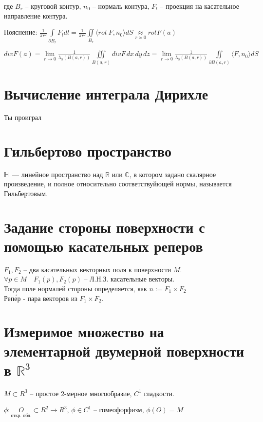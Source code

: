 \documentclass[paper=a4, fontsize=14pt]{article}
\begin{document}
где $ B_r $ -- круговой контур, $ n_0 $ -- нормаль контура, $ F_l $ -- проекция на касательное направление контура. 

Пояснение: $ \frac{1}{\pi r^2} \int\limits_{\partial B_r} F_ldl =  \frac{1}{\pi r^2} \iint\limits_{B_r} \langle rot\ F, n_0 \rangle dS \underset{r \approx 0}{\approx} rot F(a)$



$div F(a) = \lim\limits_{r\to 0} \frac{1}{\lambda_3(B(a,r))} \iiint\limits_{B(a,r)} div F \,dx\,dy\,dz = \lim\limits_{r\to 0} \frac{1}{\lambda_3(B(a,r))} \iint\limits_{\partial B(a,r)} \langle F, n_0 \rangle dS$

\section{Вычисление интеграла Дирихле}
Ты проиграл

\section{Гильбертово пространство}
$\mathds{H}$~--- линейное пространство над $\mathds{R}$ или $\mathds{C}$, в котором задано скалярное произведение, и полное относительно соответствуйющей нормы, называется Гильбертовым.

\section{Задание стороны поверхности с помощью касательных реперов}

$F_1, F_2$ -- два касательных векторных поля к поверхности $M$.\\
$\forall p \in M \quad F_1(p), F_2(p)$ -- Л.Н.З. касательные векторы.\\
Тогда поле нормалей стороны определяется, как $n := F_1 \times F_2$\\

Реп\'{е}р - пара векторов из $F_1 \times F_2$.

\section{Измеримое множество на элементарной двумерной поверхности в $\mathds{R}^3$}

$ M \subset R^3 $ -- простое 2-мерное многообразие, $ C^1 $ гладкости.

$ \phi : \underset{\text{откр. обл.}}{O} \subset R^2 \rightarrow R^3$, $ \phi \in C^1 $ -- гомеофорфизм, $ \phi(O) = M $
\end{document}
